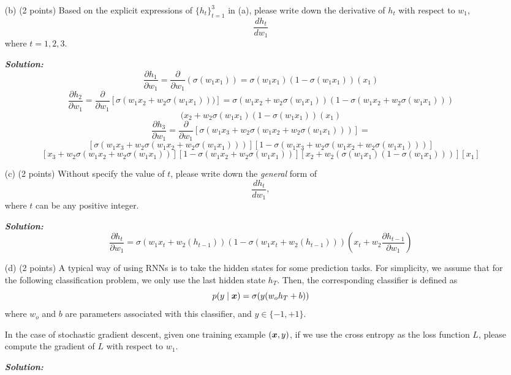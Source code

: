 \documentclass[10pt]{article}
\begin{document}
\begin{enumerate}
\begin{itemize}
  
  \item[(b)] (2 points) Based on the explicit expressions of $\{h_t\}_{t=1}^{3}$ in (a), please write down the derivative of $h_t$ with respect to $w_1$, $$\frac{d h_t}{d w_1}$$ where $t=1,2,3$. \par
 \hspace{\parindent}\textit{\textbf{Solution:}}
$$  \frac{\partial h_1}{\partial w_1} =   \frac{\partial }{\partial w_1} (\sigma(w_1 x_1) )=  \sigma(w_1 x_1)( 1 - \sigma(w_1 x_1)) (x_1) $$ 
$$  \frac{\partial h_2}{\partial w_1} =   \frac{\partial }{\partial w_1}[ \sigma(w_1 x_2 + w_2 \sigma(w_1 x_1)))] = \sigma(w_1 x_2 + w_2 \sigma(w_1 x_1)) (1 - \sigma(w_1 x_2 + w_2  \sigma( w_1 x_1))) $$
$$ (x_2 + w_2\sigma(w_1 x_1)(1-\sigma(w_1 x_1)) (x_1) $$
$$  \frac{\partial h_3}{\partial w_1} =  \frac{\partial }{\partial w_1} [ \sigma(w_1 x_3 + w_2 \sigma(w_1 x_2  + w_2 \sigma(w_1 x_1)))] = $$ 
$$ [\sigma(w_1 x_3 + w_2 \sigma(w_1 x_2 + w_2 \sigma (w_1 x_1 )))][ 1 - \sigma( w_1 x_3 + w_2 \sigma(w_1 x_2 + w_2 \sigma( w_1 x_1)))]$$
$$ [x_3 + w_2 \sigma (w_1 x_2 + w_2 \sigma(w_1 x_1))][1- \sigma(w_1x_2 + w_2 \sigma(w_1 x_1))] [ x_2 + w_2 (\sigma(w_1 x_1) (1 - \sigma(w_1 x_1))) ] [x_1 ] $$

  \item[(c)] (2 points) Without specify the value of $t$, please write down the \emph{general} form of $$\frac{d h_t}{d w_1},$$ where $t$ can be any positive integer. \par
  \hspace{\parindent}\textit{\textbf{Solution:}}
$$  \frac{\partial h_t}{\partial w_1} = \sigma(w_1 x_t + w_2 (h_{t-1}))( 1 - \sigma( w_1 x_t + w_2 (h_{t-1})))(x_t + w_2 \frac{\partial h_{t-1}}{\partial w_1})$$ \par
  \item[(d)] (2 points) A typical way of using RNNs is to take the hidden states for some prediction tasks. For simplicity, we assume that for the following classification problem, we only use the last hidden state $h_T$. Then, the corresponding classifier is defined as
    \begin{equation}
      p(y\mid \boldsymbol{x}) = \sigma(y (w_o h_T + b))
    \end{equation}
    where $w_o$ and $b$ are parameters associated with this classifier, and $y\in\{-1,+1\}$.
    
    In the case of stochastic gradient descent, given one training example $(\boldsymbol{x}, y)$, if we use the cross entropy as the loss function $L$, please compute the gradient of $L$ with respect to $w_1$.\par
 \hspace{\parindent}\textit{\textbf{Solution:}}


\end{itemize}
\end{enumerate}
\end{document}
